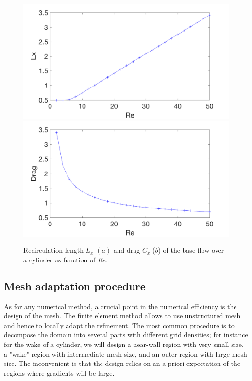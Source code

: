 \documentclass[twocolumn,10pt]{asme2ej}
\begin{document}
\begin{figure}
\includegraphics[width=.9 \linewidth]{Cylinder_Lx_baseflow.png}
\includegraphics[width=.9 \linewidth]{Cylinder_Drag_baseflow.png}
\caption{Recirculation length $L_x$ $(a)$  and drag $C_x$ ($b$) of the base flow over a cylinder as function of $Re$.}
\label{fig:LxandDrag}
\end{figure}




\subsection{Mesh adaptation procedure}
\vspace{.2cm}

As for any numerical method, a crucial point in the numerical efficiency is the design of the mesh. The finite element method allows to use unstructured mesh and hence to locally adapt the refinement. %
The most common procedure is to decompose the domain into several parts with different grid densities; for instance for the wake of a cylinder, we will design a near-wall region with very small  size, a "wake" region with intermediate mesh size, and an outer region with large mesh size. The inconvenient is that the design relies on an a priori expectation of the regions where gradients will be large. 
\end{document}
